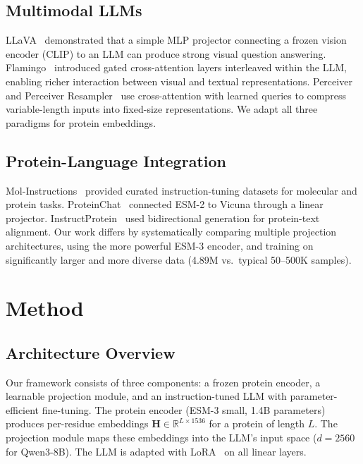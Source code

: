 \documentclass[11pt]{article}
\begin{document}
\subsection{Multimodal LLMs}

LLaVA~\cite{liu2024visual} demonstrated that a simple MLP projector connecting a frozen vision encoder (CLIP) to an LLM can produce strong visual question answering. Flamingo~\cite{alayrac2022flamingo} introduced gated cross-attention layers interleaved within the LLM, enabling richer interaction between visual and textual representations. Perceiver~\cite{jaegle2021perceiver} and Perceiver Resampler~\cite{alayrac2022flamingo} use cross-attention with learned queries to compress variable-length inputs into fixed-size representations. We adapt all three paradigms for protein embeddings.

\subsection{Protein-Language Integration}

Mol-Instructions~\cite{fang2024mol} provided curated instruction-tuning datasets for molecular and protein tasks. ProteinChat~\cite{guo2023proteinchat} connected ESM-2 to Vicuna through a linear projector. InstructProtein~\cite{wang2023instructprotein} used bidirectional generation for protein-text alignment. Our work differs by systematically comparing multiple projection architectures, using the more powerful ESM-3 encoder, and training on significantly larger and more diverse data (4.89M vs.\ typical 50--500K samples).

\section{Method}

\subsection{Architecture Overview}

Our framework consists of three components: a frozen protein encoder, a learnable projection module, and an instruction-tuned LLM with parameter-efficient fine-tuning. The protein encoder (ESM-3 small, 1.4B parameters) produces per-residue embeddings $\mathbf{H} \in \mathbb{R}^{L \times 1536}$ for a protein of length $L$. The projection module maps these embeddings into the LLM's input space ($d = 2560$ for Qwen3-8B). The LLM is adapted with LoRA~\cite{hu2022lora} on all linear layers.
\end{document}
